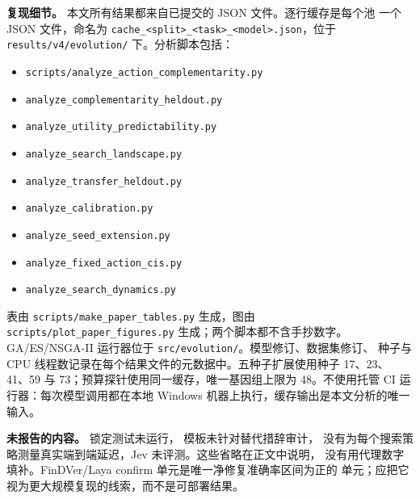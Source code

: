 \textbf{复现细节。} 本文所有结果都来自已提交的 JSON 文件。逐行缓存是每个池
一个 JSON 文件，命名为 \texttt{cache\_<split>\_<task>\_<model>.json}，位于
\texttt{results/v4/evolution/} 下。分析脚本包括：
\begin{itemize}\setlength{\itemsep}{0pt}\setlength{\parskip}{0pt}
\item \texttt{scripts/analyze\_action\_complementarity.py}
\item \texttt{analyze\_complementarity\_heldout.py}
\item \texttt{analyze\_utility\_predictability.py}
\item \texttt{analyze\_search\_landscape.py}
\item \texttt{analyze\_transfer\_heldout.py}
\item \texttt{analyze\_calibration.py}
\item \texttt{analyze\_seed\_extension.py}
\item \texttt{analyze\_fixed\_action\_cis.py}
\item \texttt{analyze\_search\_dynamics.py}
\end{itemize}
表由 \texttt{scripts/make\_paper\_tables.py} 生成，图由
\texttt{scripts/plot\_paper\_figures.py} 生成；两个脚本都不含手抄数字。
GA/ES/NSGA-II 运行器位于 \texttt{src/evolution/}。模型修订、数据集修订、
种子与 CPU 线程数记录在每个结果文件的元数据中。五种子扩展使用种子 17、23、
41、59 与 73；预算探针使用同一缓存，唯一基因组上限为 48。不使用托管 CI
运行器：每次模型调用都在本地 Windows 机器上执行，缓存输出是本文分析的唯一
输入。

\textbf{未报告的内容。} 锁定测试未运行，\noul{} 模板未针对替代措辞审计，
没有为每个搜索策略测量真实端到端延迟，Jev 未评测。这些省略在正文中说明，
没有用代理数字填补。FinDVer/Laya confirm 单元是唯一净修复准确率区间为正的
单元；应把它视为更大规模复现的线索，而不是可部署结果。
